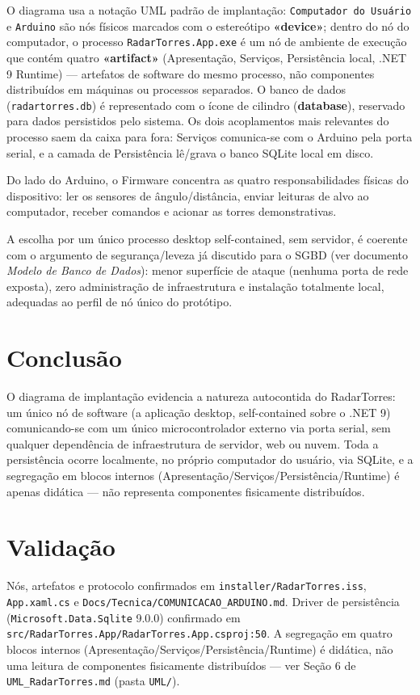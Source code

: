 O diagrama usa a notação UML padrão de implantação: \texttt{Computador do Usuário} e
\texttt{Arduino} são nós físicos marcados com o estereótipo \textbf{«device»}; dentro do nó do
computador, o processo \texttt{RadarTorres.App.exe} é um nó de ambiente de execução que contém
quatro \textbf{«artifact»} (Apresentação, Serviços, Persistência local, .NET 9 Runtime) ---
artefatos de software do mesmo processo, não componentes distribuídos em máquinas ou processos
separados. O banco de dados (\texttt{radartorres.db}) é representado com o ícone de cilindro
(\textbf{database}), reservado para dados persistidos pelo sistema. Os dois acoplamentos mais
relevantes do processo saem da caixa para fora: Serviços comunica-se com o Arduino pela porta
serial, e a camada de Persistência lê/grava o banco SQLite local em disco.

Do lado do Arduino, o Firmware concentra as quatro responsabilidades físicas do dispositivo: ler
os sensores de ângulo/distância, enviar leituras de alvo ao computador, receber comandos e
acionar as torres demonstrativas.

A escolha por um único processo desktop self-contained, sem servidor, é coerente com o argumento
de segurança/leveza já discutido para o SGBD (ver documento \emph{Modelo de Banco de Dados}):
menor superfície de ataque (nenhuma porta de rede exposta), zero administração de infraestrutura
e instalação totalmente local, adequadas ao perfil de nó único do protótipo.

\section{Conclusão}

O diagrama de implantação evidencia a natureza autocontida do RadarTorres: um único nó de
software (a aplicação desktop, self-contained sobre o .NET 9) comunicando-se com um único
microcontrolador externo via porta serial, sem qualquer dependência de infraestrutura de
servidor, web ou nuvem. Toda a persistência ocorre localmente, no próprio computador do usuário,
via SQLite, e a segregação em blocos internos (Apresentação/Serviços/Persistência/Runtime) é
apenas didática --- não representa componentes fisicamente distribuídos.

\section{Validação}

Nós, artefatos e protocolo confirmados em \texttt{installer/RadarTorres.iss},
\texttt{App.xaml.cs} e \texttt{Docs/Tecnica/COMUNICACAO\_ARDUINO.md}. Driver de persistência
(\texttt{Microsoft.Data.Sqlite} 9.0.0) confirmado em
\texttt{src/RadarTorres.App/RadarTorres.App.csproj:50}. A segregação em quatro blocos internos
(Apresentação/Serviços/Persistência/Runtime) é didática, não uma leitura de componentes
fisicamente distribuídos --- ver Seção 6 de \texttt{UML\_RadarTorres.md} (pasta \texttt{UML/}).
